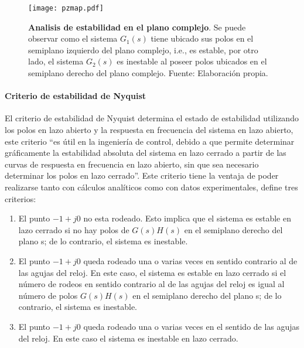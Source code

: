                 \begin{figure}[htb]
                    \centering
                    \texttt{[image: pzmap.pdf]}
                    \caption[Ejemplo de analisis de estabilidad en el plano complejo]{\textbf{Analisis de estabilidad en el plano complejo}. Se puede observar como el sistema $G_1(s)$ tiene ubicado sus polos en el semiplano izquierdo del plano complejo, i.e., es estable, por otro lado, el sistema $G_2(s)$ es inestable al poseer polos ubicados en el semiplano derecho del plano complejo. Fuente: Elaboración propia.} 
                    \label{fig:pzmap}
                \end{figure}
            
            \paragraph{Criterio de estabilidad de Nyquist}
                
                El criterio de estabilidad de Nyquist determina el estado de estabilidad utilizando los polos en lazo abierto y la respuesta en frecuencia del sistema en lazo abierto, este criterio \enquote{es útil en la ingeniería de control, debido a que permite determinar gráficamente la estabilidad absoluta del sistema en lazo cerrado a partir de las curvas de respuesta en frecuencia en lazo abierto, sin que sea necesario determinar los polos en lazo cerrado}\Parencite[p.$\,$446]{ogata2003ingenieria}. Este criterio tiene la ventaja de poder realizarse tanto con cálculos analíticos como con datos experimentales, \textcite{ogata2003ingenieria} define tres criterios: 
                
                \begin{enumerate}[leftmargin=\parindent]
                    \item El punto $-1 + j0$ no esta rodeado. Esto implica que el sistema es estable en lazo cerrado si no hay polos de $G(s)H(s)$ en el semiplano derecho del plano s; de lo contrario, el sistema es inestable.
                    \item El punto $-1 + j0$ queda rodeado una o varias veces en sentido contrario al de las agujas
                    del reloj. En este caso, el sistema es estable en lazo cerrado si el número de rodeos en sentido contrario
                    al de las agujas del reloj es igual al número de polos $G(s)H(s)$ en el semiplano derecho
                    del plano s; de lo contrario, el sistema es inestable.
                    \item El punto $-1 + j0$ queda rodeado una o varias veces en el sentido de las agujas del reloj.
                    En este caso el sistema es inestable en lazo cerrado.
                \end{enumerate}
                

